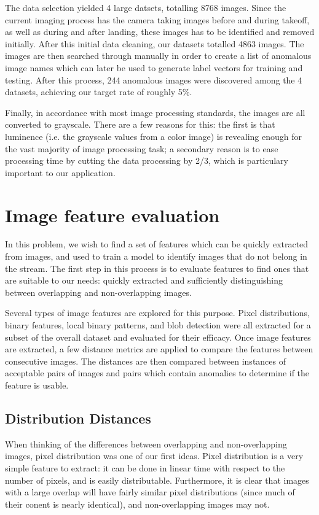The data selection yielded 4 large datsets, totalling 8768 images.
Since the current imaging process has the camera taking images before and during takeoff, as well as during and after landing, these images has to be identified and removed initially.
After this initial data cleaning, our datasets totalled 4863 images.
The images are then searched through manually in order to create a list of anomalous image names which can later be used to generate label vectors for training and testing.
After this process, 244 anomalous images were discovered among the 4 datasets, achieving our target rate of roughly 5\%.

Finally, in accordance with most image processing standards, the images are all converted to grayscale.
There are a few reasons for this: the first is that luminence (i.e. the grayscale values from a color image) is revealing enough for the vast majority of image processing task; a secondary reason is to ease processing time by cutting the data processing by 2/3, which is particulary important to our application.



\section{Image feature evaluation}
In this problem, we wish to find a set of features which can be quickly extracted from images, and used to train a model to identify images that do not belong in the stream.
The first step in this process is to evaluate features to find ones that are suitable to our needs: quickly extracted and sufficiently distinguishing between overlapping and non-overlapping images.

Several types of image features are explored for this purpose.
Pixel distributions, binary features, local binary patterns, and blob detection were all extracted for a subset of the overall dataset and evaluated for their efficacy.
Once image features are extracted, a few distance metrics are applied to compare the features between consecutive images.
The distances are then compared between instances of acceptable pairs of images and pairs which contain anomalies to determine if the feature is usable.


\subsection{Distribution Distances}

When thinking of the differences between overlapping and non-overlapping images, pixel distribution was one of our first ideas.
Pixel distribution is a very simple feature to extract: it can be done in linear time with respect to the number of pixels, and is easily distributable.
Furthermore, it is clear that images with a large overlap will have fairly similar pixel distributions (since much of their conent is nearly identical), and non-overlapping images may not.

